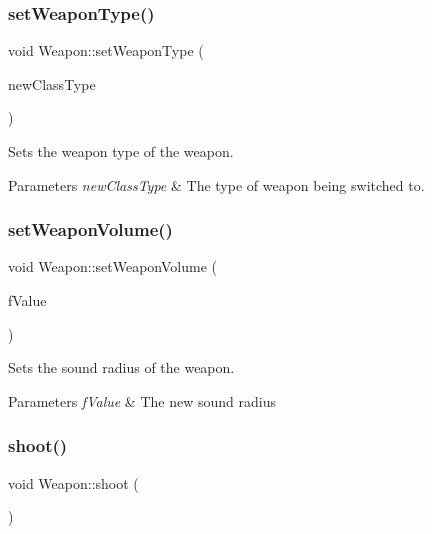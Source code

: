 \subsubsection{\texorpdfstring{set\+Weapon\+Type()}{setWeaponType()}}
{\footnotesize\ttfamily void Weapon\+::set\+Weapon\+Type (\begin{DoxyParamCaption}\item[{\hyperlink{_weapon_8h_ab84a9103ee8e782337e098ae19af7a29}{class\+Type}}]{new\+Class\+Type }\end{DoxyParamCaption})}



Sets the weapon type of the weapon. 


\begin{DoxyParams}{Parameters}
{\em new\+Class\+Type} & The type of weapon being switched to. \\
\hline
\end{DoxyParams}
\mbox{\label{class_weapon_ac54bf0fb4b7ba439d38a22e6e8c203ed}} 
\subsubsection{\texorpdfstring{set\+Weapon\+Volume()}{setWeaponVolume()}}
{\footnotesize\ttfamily void Weapon\+::set\+Weapon\+Volume (\begin{DoxyParamCaption}\item[{float}]{f\+Value }\end{DoxyParamCaption})}



Sets the sound radius of the weapon. 


\begin{DoxyParams}{Parameters}
{\em f\+Value} & The new sound radius \\
\hline
\end{DoxyParams}
\mbox{\label{class_weapon_a063d0eb2cf432d72dc22f6ec565a1a16}} 
\subsubsection{\texorpdfstring{shoot()}{shoot()}}
{\footnotesize\ttfamily void Weapon\+::shoot (\begin{DoxyParamCaption}{ }\end{DoxyParamCaption})}

